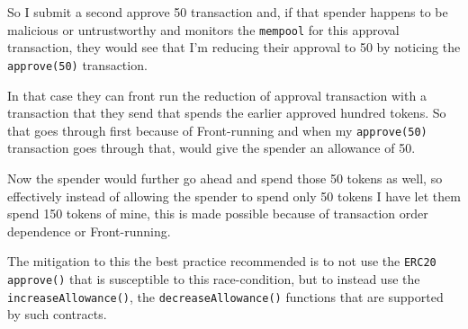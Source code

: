 So I submit a second approve 50 transaction and, if that spender happens
to be malicious or untrustworthy and monitors the \texttt{mempool} for
this approval transaction, they would see that I'm reducing their
approval to 50 by noticing the \texttt{approve(50)} transaction.

In that case they can front run the reduction of approval transaction
with a transaction that they send that spends the earlier approved
hundred tokens. So that goes through first because of Front-running and
when my \texttt{approve(50)} transaction goes through that, would give
the spender an allowance of 50.

Now the spender would further go ahead and spend those 50 tokens as
well, so effectively instead of allowing the spender to spend only 50
tokens I have let them spend 150 tokens of mine, this is made possible
because of transaction order dependence or Front-running.

The mitigation to this the best practice recommended is to not use the
\texttt{ERC20} \texttt{approve()} that is susceptible to this
race-condition, but to instead use the \texttt{increaseAllowance()}, the
\texttt{decreaseAllowance()} functions that are supported by such
contracts.
